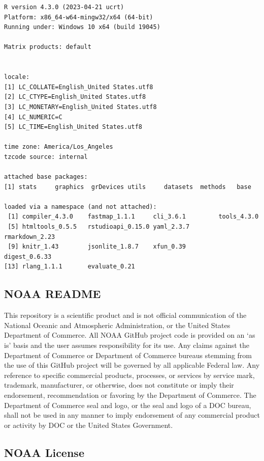 \documentclass[
  letterpaper,
  oneside,
  open=any]{scrbook}
\begin{document}
\begin{verbatim}
R version 4.3.0 (2023-04-21 ucrt)
Platform: x86_64-w64-mingw32/x64 (64-bit)
Running under: Windows 10 x64 (build 19045)

Matrix products: default


locale:
[1] LC_COLLATE=English_United States.utf8 
[2] LC_CTYPE=English_United States.utf8   
[3] LC_MONETARY=English_United States.utf8
[4] LC_NUMERIC=C                          
[5] LC_TIME=English_United States.utf8    

time zone: America/Los_Angeles
tzcode source: internal

attached base packages:
[1] stats     graphics  grDevices utils     datasets  methods   base     

loaded via a namespace (and not attached):
 [1] compiler_4.3.0    fastmap_1.1.1     cli_3.6.1         tools_4.3.0      
 [5] htmltools_0.5.5   rstudioapi_0.15.0 yaml_2.3.7        rmarkdown_2.23   
 [9] knitr_1.43        jsonlite_1.8.7    xfun_0.39         digest_0.6.33    
[13] rlang_1.1.1       evaluate_0.21    
\end{verbatim}

\hypertarget{noaa-readme}{%
\subsection{NOAA README}\label{noaa-readme}}

This repository is a scientific product and is not official
communication of the National Oceanic and Atmospheric Administration, or
the United States Department of Commerce. All NOAA GitHub project code
is provided on an `as is' basis and the user assumes responsibility for
its use. Any claims against the Department of Commerce or Department of
Commerce bureaus stemming from the use of this GitHub project will be
governed by all applicable Federal law. Any reference to specific
commercial products, processes, or services by service mark, trademark,
manufacturer, or otherwise, does not constitute or imply their
endorsement, recommendation or favoring by the Department of Commerce.
The Department of Commerce seal and logo, or the seal and logo of a DOC
bureau, shall not be used in any manner to imply endorsement of any
commercial product or activity by DOC or the United States Government.

\hypertarget{noaa-license}{%
\subsection{NOAA License}\label{noaa-license}}
\end{document}
